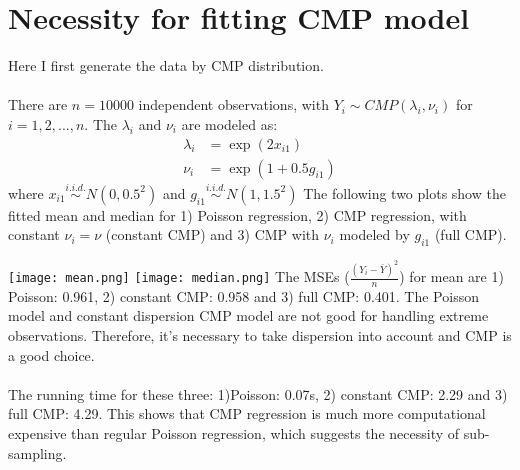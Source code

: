 \documentclass[]{article}
\begin{document}
\section{Necessity for fitting CMP model}
Here I first generate the data by CMP distribution.\\
\\
There are $n = 10000$ independent observations, with $Y_i \sim CMP(\lambda_i, \nu_i)$ for $i = 1, 2,..., n$. The $\lambda_i$ and $\nu_i$ are modeled as:
\begin{align*}
	\lambda_i &= \exp(2x_{i1})\\
	\nu_i &= \exp(1 + 0.5g_{i1})
\end{align*}
where $x_{i1} \stackrel{i.i.d.}{\sim} N(0, 0.5^2)$ and $g_{i1} \stackrel{i.i.d.}{\sim} N(1, 1.5^2)$ The following two plots show the fitted mean and median for 1) Poisson regression, 2) CMP regression, with constant $\nu_i = \nu$ (constant CMP) and 3) CMP with $\nu_i$ modeled by $g_{i1}$ (full CMP).\\
\graphicspath{{D:/GitHub/sub-sampling/COM-Poisson/cdoe/}}
\texttt{[image: mean.png]}
\texttt{[image: median.png]}
The MSEs ($\frac{(Y_i - \bar{Y})^2}{n}$) for mean are 1) Poisson: 0.961, 2) constant CMP: 0.958 and 3) full CMP: 0.401. The Poisson model and constant dispersion CMP model are not good for handling extreme observations. Therefore, it's necessary to take dispersion into account and CMP is a good choice.\\
\\
The running time for these three: 1)Poisson: 0.07s, 2) constant CMP: 2.29 and 3) full CMP: 4.29. This shows that CMP regression is much more computational expensive than regular Poisson regression, which suggests the necessity of sub-sampling.
\end{document}
